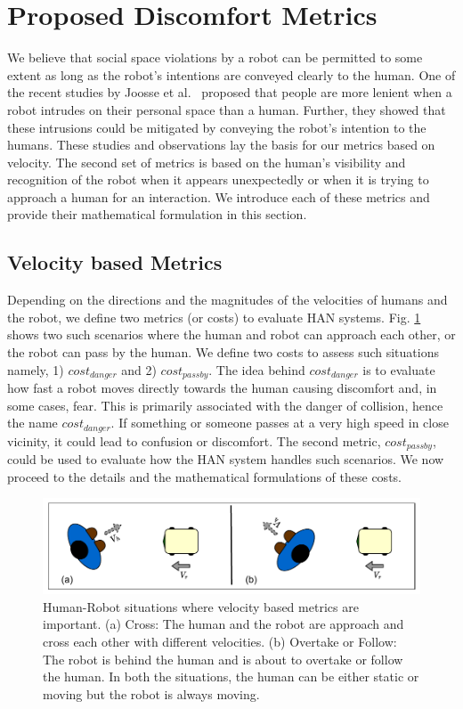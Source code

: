 \section{Proposed Discomfort Metrics}\label{new_metrics}
We believe that social space violations by a robot can be permitted to some extent as long as the robot's intentions are conveyed clearly to the human. One of the recent studies by Joosse et al.~\cite{joosse2021making} proposed that people are more lenient when a robot intrudes on their personal space than a human. Further, they showed that these intrusions could be mitigated by conveying the robot's intention to the humans. These studies and observations lay the basis for our metrics based on velocity. The second set of metrics is based on the human's visibility and recognition of the robot when it appears unexpectedly or when it is trying to approach a human for an interaction. We introduce each of these metrics and provide their mathematical formulation in this section.

\subsection{Velocity based Metrics}
Depending on the directions and the magnitudes of the velocities of humans and the robot, we define two metrics (or costs) to evaluate HAN systems. Fig. \ref{fig:vel_metrics} shows two such scenarios where the human and robot can approach each other, or the robot can pass by the human. We define two costs to assess such situations namely, 1) $cost_{danger}$ and 2) $cost_{passby}$. The idea behind $cost_{danger}$ is to evaluate how fast a robot moves directly towards the human causing discomfort and, in some cases, fear. This is primarily associated with the danger of collision, hence the name $cost_{danger}$. If something or someone passes at a very high speed in close vicinity, it could lead to confusion or discomfort. The second metric, $cost_{passby}$, could be used to evaluate how the HAN system handles such scenarios. We now proceed to the details and the mathematical formulations of these costs.
\begin{figure}[!h]
    \centering
    \includegraphics[width=0.9\columnwidth]{images/chapter6/vel_metrics.pdf}
    \caption{Human-Robot situations where velocity based metrics are important. (a) Cross: The human and the robot are approach and cross each other with different velocities. (b) Overtake or Follow: The robot is behind the human and is about to overtake or follow the human. In both the situations, the human can be either static or moving but the robot is always moving.}
    \label{fig:vel_metrics}
\end{figure}

